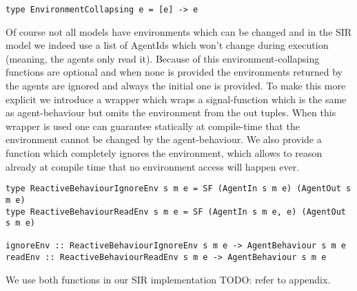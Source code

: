 \begin{verbatim}
type EnvironmentCollapsing e = [e] -> e
\end{verbatim}

Of course not all models have environments which can be changed and in the SIR model we indeed use a list of AgentIds which won't change during execution (meaning, the agents only read it). Because of this environment-collapsing functions are optional and when none is provided the environments returned by the agents are ignored and always the initial one is provided.
To make this more explicit we introduce a wrapper which wraps a signal-function which is the same as agent-behaviour but omits the environment from the out tuples. When this wrapper is used one can guarantee statically at compile-time that the environment cannot be changed by the agent-behaviour. We also provide a function which completely ignores the environment, which allows to reason already at compile time that no environment access will happen ever.

\begin{verbatim}
type ReactiveBehaviourIgnoreEnv s m e = SF (AgentIn s m e) (AgentOut s m e)
type ReactiveBehaviourReadEnv s m e = SF (AgentIn s m e, e) (AgentOut s m e)

ignoreEnv :: ReactiveBehaviourIgnoreEnv s m e -> AgentBehaviour s m e 
readEnv :: ReactiveBehaviourReadEnv s m e -> AgentBehaviour s m e 
\end{verbatim}

We use both functions in our SIR implementation TODO: refer to appendix.